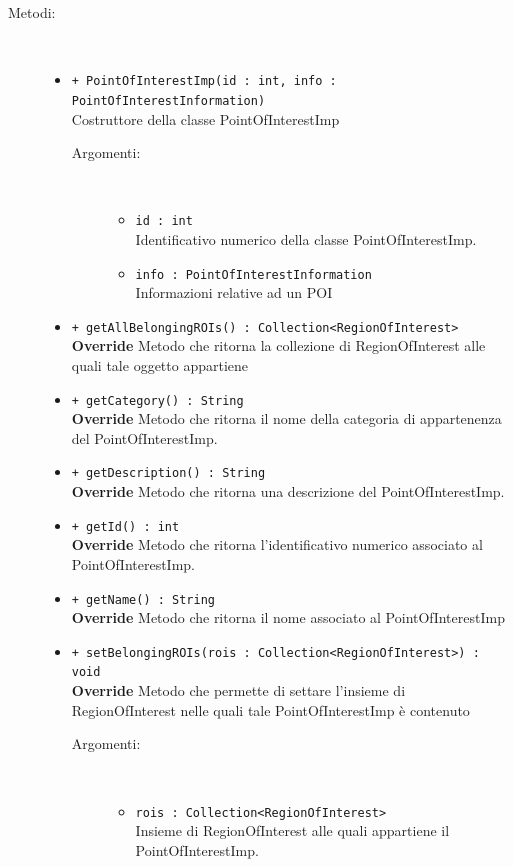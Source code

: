 \documentclass[../DefinizioneDiProdotto.tex]{subfiles}
\begin{document}
\begin{description}
\begin{itemize}
	\end{itemize}
	\item[Metodi:] \
	\begin{itemize}
		\item \texttt{+ PointOfInterestImp(id  : int, info : PointOfInterestInformation)}\\
		Costruttore della classe PointOfInterestImp
		\begin{description}
			\item[Argomenti:] \
			\begin{itemize}
				\item \texttt{id  : int}\\
				Identificativo numerico della classe PointOfInterestImp.\item \texttt{info : PointOfInterestInformation}\\
				Informazioni relative ad un POI\end{itemize}
		\end{description}
		\item \texttt{+ getAllBelongingROIs() : Collection<RegionOfInterest>}\\
		\textbf{Override} Metodo che ritorna la collezione di RegionOfInterest alle quali tale oggetto appartiene
		\item \texttt{+ getCategory() : String}\\
		\textbf{Override} Metodo che ritorna il nome della categoria di appartenenza del PointOfInterestImp.
		\item \texttt{+ getDescription() : String}\\
		\textbf{Override} Metodo che ritorna una descrizione del PointOfInterestImp.
		\item \texttt{+ getId() : int}\\
		\textbf{Override} Metodo che ritorna l'identificativo numerico associato al PointOfInterestImp.
		\item \texttt{+ getName() : String}\\
		\textbf{Override} Metodo che ritorna il nome associato al PointOfInterestImp
		\item \texttt{+ setBelongingROIs(rois : Collection<RegionOfInterest>) : void}\\
		\textbf{Override} Metodo che permette di settare l'insieme di RegionOfInterest nelle quali tale PointOfInterestImp è contenuto
		\begin{description}
			\item[Argomenti:] \
			\begin{itemize}
				\item \texttt{rois : Collection<RegionOfInterest>}\\
				Insieme di RegionOfInterest alle quali appartiene il PointOfInterestImp.\end{itemize}
		\end{description}
	\end{itemize}
\end{description}
\end{document}
